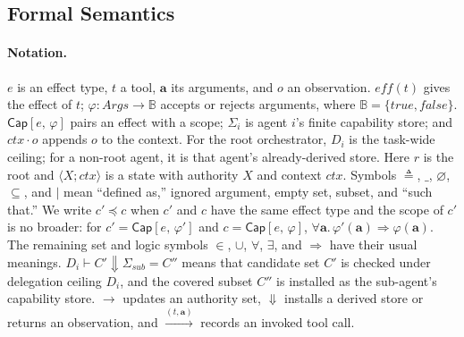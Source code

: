\documentclass[sigplan,review,anonymous]{acmart}
\renewcommand{\Cap}[2]{\textsf{Cap}[{#1},\,{#2}]}
\begin{document}
  \subsection{Formal Semantics}
  \label{sec:formalism}

  \paragraph{Notation.}
  $e$ is an effect type, $t$ a tool, $\mathbf a$ its arguments, and $o$ an
  observation. $\mathit{eff}(t)$ gives the effect of $t$;
  $\varphi:\mathit{Args}\to\mathbb B$ accepts or rejects arguments, where
  $\mathbb B=\{\mathit{true},\mathit{false}\}$. $\Cap{e}{\varphi}$ pairs an
  effect with a scope; $\Sigma_i$ is agent $i$'s finite capability store; and
  $\mathit{ctx}\cdot o$ appends $o$ to the context. For the root orchestrator,
  $D_i$ is the task-wide ceiling; for a non-root agent, it is that agent's
  already-derived store. Here $r$ is the root and $\langle X;\mathit{ctx}\rangle$
  is a state with authority $X$ and context $\mathit{ctx}$. Symbols $\triangleq$,
  $\_$, $\varnothing$, $\subseteq$, and $\mid$ mean ``defined as,'' ignored
  argument, empty set, subset, and ``such that.'' We write $c'\preceq c$ when $c'$ and $c$ have the same
  effect type and the scope of $c'$ is no broader: for
  $c'=\Cap{e}{\varphi'}$ and $c=\Cap{e}{\varphi}$,
  $\forall\mathbf a.\,\varphi'(\mathbf a)\Rightarrow\varphi(\mathbf a)$.
  The remaining set and logic symbols $\in$, $\cup$, $\forall$, $\exists$, and
  $\Rightarrow$ have their usual meanings.
  $D_i\vdash C'\Downarrow\Sigma_{\mathit{sub}}=C''$ means that candidate set
  $C'$ is checked under delegation ceiling $D_i$, and the covered subset $C''$
  is installed as the sub-agent's capability store.
  $\longrightarrow$ updates an authority set, $\Downarrow$ installs a derived store or
  returns an observation, and $\xrightarrow{(t,\mathbf a)}$ records an invoked
  tool call.
\end{document}
